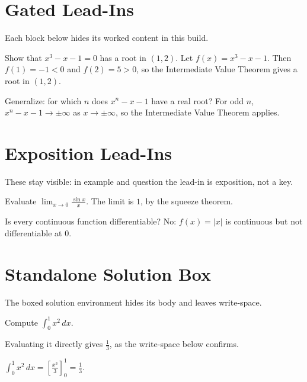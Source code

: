 \documentclass{didactic}
\begin{document}
\maketitle

\section{Gated Lead-Ins}
Each block below hides its worked content in this build.

\begin{exercise}
	Show that $x^3 - x - 1 = 0$ has a root in $(1, 2)$.
	\solution Let $f(x) = x^3 - x - 1$. Then $f(1) = -1 < 0$ and $f(2) = 5 > 0$,
	so the Intermediate Value Theorem gives a root in $(1, 2)$.
\end{exercise}

\begin{challenge}
	Generalize: for which $n$ does $x^n - x - 1$ have a real root?
	\pf For odd $n$, $x^n - x - 1 \to \pm\infty$ as $x \to \pm\infty$, so the
	Intermediate Value Theorem applies.
\end{challenge}

\section{Exposition Lead-Ins}
These stay visible: in example and question the lead-in is exposition, not a key.

\begin{example}
	Evaluate $\lim_{x \to 0} \frac{\sin x}{x}$.
	\solution The limit is $1$, by the squeeze theorem.
\end{example}

\begin{question}
	Is every continuous function differentiable?
	\ans No: $f(x) = |x|$ is continuous but not differentiable at $0$.
\end{question}

\section{Standalone Solution Box}
The boxed {solution} environment hides its body and leaves write-space.

\begin{exercise}
	Compute $\int_0^1 x^2 \, dx$.
\end{exercise}

Evaluating it directly gives $\tfrac{1}{3}$, as the write-space below confirms.
\begin{solution}[2cm]
	$\int_0^1 x^2 \, dx = \left[ \tfrac{x^3}{3} \right]_0^1 = \tfrac{1}{3}$.
\end{solution}
\end{document}
